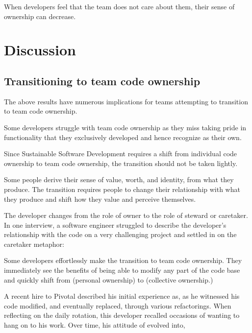 When developers feel that the team does not care about them, their sense of ownership can decrease.
\section{Discussion}
\subsection{Transitioning to team code ownership}
\label{Transitioning}

The above results have numerous implications for teams attempting to transition to team code ownership. 


Some developers struggle with team code ownership as they miss taking pride in functionality that they exclusively developed and hence recognize as their own. 

Since Sustainable Software Development requires a shift from individual code ownership to team code ownership, the transition should not be taken lightly. 

Some people derive their sense of value, worth, and identity, from what they produce. The transition requires people to change their relationship with what they produce and shift how they value and perceive themselves.

The developer changes from the role of owner to the role of steward or caretaker. In one interview, a software engineer struggled to describe the developer's relationship with the code on a very challenging project and settled in on the caretaker metaphor: 

Some developers effortlessly make the transition to team code ownership. They immediately see the benefits of being able to modify any part of the code base and quickly shift from  (personal ownership) to  (collective ownership.)

A recent hire to Pivotal described his initial experience as,  as he witnessed his code modified, and eventually replaced, through various refactorings. When reflecting on the daily rotation, this developer recalled occasions of wanting to hang on to his work.  Over time, his attitude of  evolved into,  

